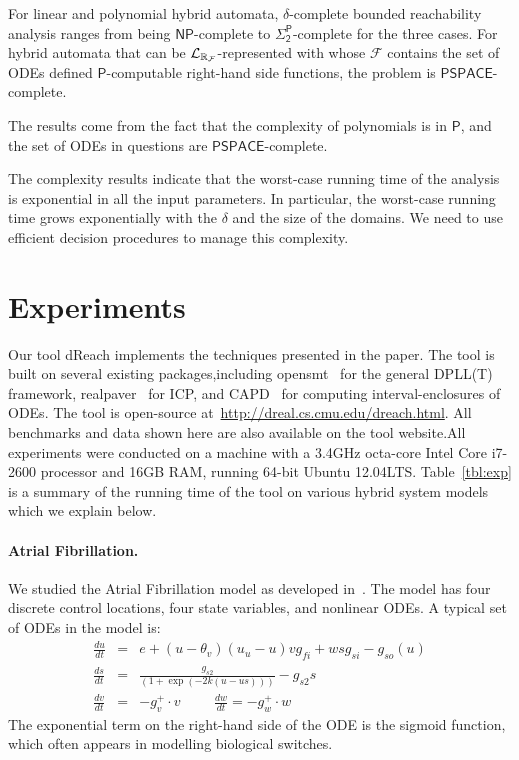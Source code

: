 \documentclass[12pt]{llncs}
\begin{document}
\begin{corollary}
For linear and polynomial hybrid automata, $\delta$-complete bounded reachability analysis ranges from being $\mathsf{NP}$-complete to $\mathsf{\Sigma_2^P}$-complete for the three cases. For hybrid automata that can be $\mathcal{L}_{\mathbb{R}_{\mathcal{F}}}$-represented with whose $\mathcal{F}$ contains the set of ODEs defined $\mathsf{P}$-computable right-hand side functions, the problem is $\mathsf{PSPACE}$-complete.
\end{corollary}
The results come from the fact that the complexity of polynomials is in $\mathsf{P}$, and the set of ODEs in questions are $\mathsf{PSPACE}$-complete.
\begin{remark}
The complexity results indicate that the worst-case running time of the analysis is exponential in all the input parameters. In particular, the worst-case running time grows exponentially with the $\delta$ and the size of the domains. We need to use efficient decision procedures to manage this complexity.
\end{remark}

\section{Experiments}


Our tool {\sf dReach} implements the techniques presented in the
paper. The tool is built on several existing packages,including {\sf
  opensmt}~\cite{DBLP:conf/tacas/BruttomessoPST10} for the general
DPLL(T) framework, {\sf
  realpaver}~\cite{DBLP:journals/toms/GranvilliersB06} for ICP, and
{\sf CAPD}~\cite{capd} for computing interval-enclosures of ODEs. The
tool is open-source at~\url{http://dreal.cs.cmu.edu/dreach.html}. All
benchmarks and data shown here are also available on the tool
website.All experiments were conducted on a machine with a 3.4GHz
octa-core Intel Core i7-2600 processor and 16GB RAM, running 64-bit
Ubuntu 12.04LTS. Table~\ref{tbl:exp} is a summary of the running time
of the tool on various hybrid system models which we explain below.

\paragraph{Atrial Fibrillation.} We studied the Atrial Fibrillation model as developed in~\cite{DBLP:conf/cav/GrosuBFGGSB11}. The model has four discrete control locations, four state variables, and nonlinear ODEs. A typical set of ODEs in the model is:
\begin{eqnarray*}
\frac{du}{dt} &=& e + (u-\theta_v)(u_u-u ) v g_{fi} + wsg_{si}-g_{so}(u)\\
\frac{ds}{dt} &=& \displaystyle\frac{g_{s2}}{(1+\exp(-2k(u-us)))} -  g_{s2}s\\
\frac{dv}{dt} &=& -g_v^+\cdot v \hspace{1cm} \frac{dw}{dt} = -g_w^+\cdot w
\end{eqnarray*}
The exponential term on the right-hand side of the ODE is the sigmoid function, which often appears in modelling biological switches.
\end{document}
